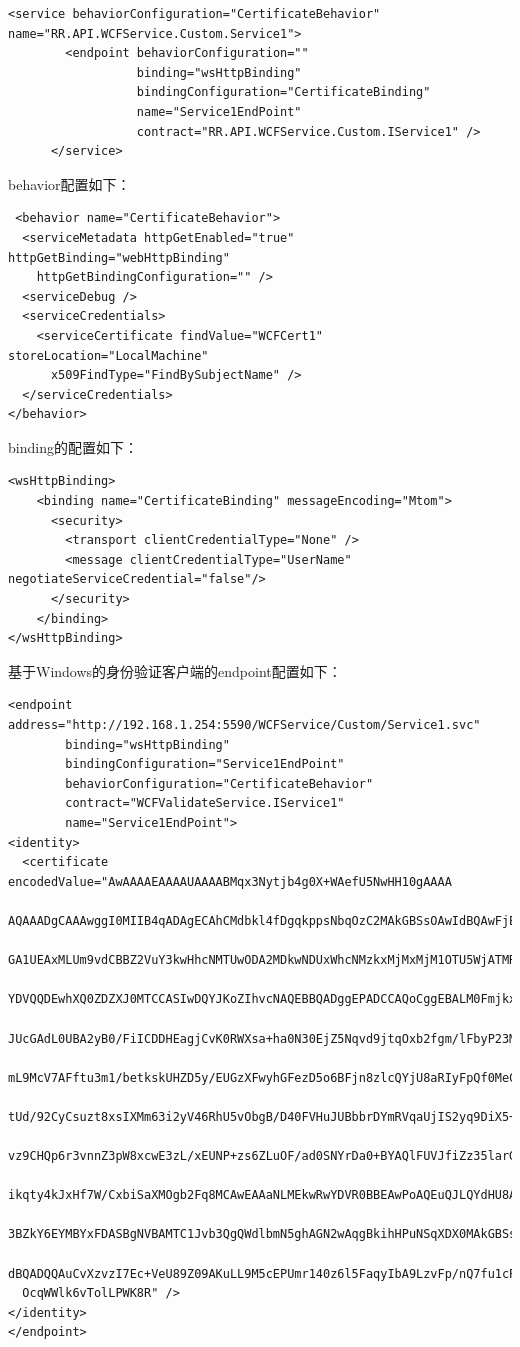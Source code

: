 \documentclass{book}
\begin{document}
\begin{lstlisting}
<service behaviorConfiguration="CertificateBehavior" name="RR.API.WCFService.Custom.Service1">
        <endpoint behaviorConfiguration="" 
                  binding="wsHttpBinding" 
                  bindingConfiguration="CertificateBinding" 
                  name="Service1EndPoint" 
                  contract="RR.API.WCFService.Custom.IService1" />
      </service>
\end{lstlisting}

behavior配置如下：

\begin{lstlisting}
 <behavior name="CertificateBehavior">
  <serviceMetadata httpGetEnabled="true" httpGetBinding="webHttpBinding"
    httpGetBindingConfiguration="" />
  <serviceDebug />
  <serviceCredentials>
    <serviceCertificate findValue="WCFCert1" storeLocation="LocalMachine"
      x509FindType="FindBySubjectName" />
  </serviceCredentials>
</behavior>
\end{lstlisting}

binding的配置如下：

\begin{lstlisting}
<wsHttpBinding>
	<binding name="CertificateBinding" messageEncoding="Mtom">
	  <security>
	    <transport clientCredentialType="None" />
	    <message clientCredentialType="UserName" negotiateServiceCredential="false"/>
	  </security>
	</binding>
</wsHttpBinding>
\end{lstlisting}


基于Windows的身份验证客户端的endpoint配置如下：

\begin{lstlisting}
<endpoint address="http://192.168.1.254:5590/WCFService/Custom/Service1.svc"
        binding="wsHttpBinding"
        bindingConfiguration="Service1EndPoint"
        behaviorConfiguration="CertificateBehavior"
        contract="WCFValidateService.IService1"
        name="Service1EndPoint">
<identity>
  <certificate encodedValue="AwAAAAEAAAAUAAAABMqx3Nytjb4g0X+WAefU5NwHH10gAAAA
  AQAAADgCAAAwggI0MIIB4qADAgECAhCMdbkl4fDgqkppsNbqOzC2MAkGBSsOAwIdBQAwFjEUMBI
  GA1UEAxMLUm9vdCBBZ2VuY3kwHhcNMTUwODA2MDkwNDUxWhcNMzkxMjMxMjM1OTU5WjATMREwDw
  YDVQQDEwhXQ0ZDZXJ0MTCCASIwDQYJKoZIhvcNAQEBBQADggEPADCCAQoCggEBALM0Fmjkx88RP
  JUcGAdL0UBA2yB0/FiICDDHEagjCvK0RWXsa+ha0N30EjZ5Nqvd9jtqOxb2fgm/lFbyP23MaCp2
  mL9McV7AFftu3m1/betkskUHZD5y/EUGzXFwyhGFezD5o6BFjn8zlcQYjU8aRIyFpQf0MeCO62Z
  tUd/92CyCsuzt8xsIXMm63i2yV46RhU5vObgB/D40FVHuJUBbbrDYmRVqaUjIS2yq9DiX5+7oim
  vz9CHQp6r3vnnZ3pW8xcwE3zL/xEUNP+zs6ZLuOF/ad0SNYrDa0+BYAQlFUVJfiZz35larGLDzd
  ikqty4kJxHf7W/CxbiSaXMOgb2Fq8MCAwEAAaNLMEkwRwYDVR0BBEAwPoAQEuQJLQYdHU8AjWEh
  3BZkY6EYMBYxFDASBgNVBAMTC1Jvb3QgQWdlbmN5ghAGN2wAqgBkihHPuNSqXDX0MAkGBSsOAwI
  dBQADQQAuCvXzvzI7Ec+VeU89Z09AKuLL9M5cEPUmr140z6l5FaqyIbA9LzvFp/nQ7fu1cPjK6C
  OcqWWlk6vTolLPWK8R" />
</identity>
</endpoint>
\end{lstlisting}
\end{document}
